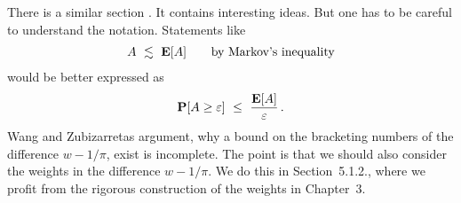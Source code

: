 \begin{remark}
  There is a similar section \cite[page 27-28]{Wang2019}.
  It contains interesting ideas. But one has to be careful to understand the notation.
  Statements like
  \begin{align*}
    A\ \lesssim\  \mathbf{E}[A] \qquad
    \text{by Markov's inequality}
  \end{align*}
  would be better expressed as
  \begin{align*}
    \P[A\ge \varepsilon]
    \ 
    \le 
    \ 
    \frac
    {\E[A]}
    {\varepsilon}
    \,.
  \end{align*}
  Wang and Zubizarretas argument, why a bound on the bracketing numbers of the difference $w-1/\pi$, exist is incomplete. 
  The point is that we should also consider the weights in the difference $w-1/\pi$. 
  We do this in Section~5.1.2., where we profit from the rigorous construction of the weights in Chapter~3.
\end{remark}


